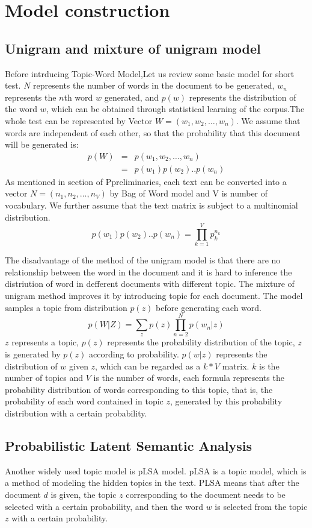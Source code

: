 \section{Model construction}\label{lca}
\subsection{Unigram and mixture of unigram model}
Before intrducing Topic-Word Model,Let us review some basic model for short test.
$N$ represents the number of words in the document to be generated, $w_n$ represents the $n$th word $w$ generated, and $p(w)$ represents the distribution of the word $w$, which can be obtained through statistical learning of the corpus.The whole test can be represented by Vector $W = (w_1,w_2,\dots,w_n)$.
We assume that words are independent of each other, so that the probability that this document will be generated is:
\begin{eqnarray*}
p(W) &=& p(w_1,w_2,\dots,w_n) \\
    &=& p(w_1)p(w_2)..p(w_n)
\end{eqnarray*}
As mentioned in section of Ppreliminaries, each text can be converted into a vector $N=(n_1,n_2,\dots,n_V)$ by Bag of Word model and V is number of vocabulary.
We further assume that the text matrix is subject to a multinomial distribution.
\[
  p(w_1)p(w_2)..p(w_n) = \prod_{k=1}^V p_k^{n_k}
\]


The disadvantage of the method of the unigram model is that there are no relationship between the word in  the document and it is hard to inference the distriution of word in defferent documents with different topic. The mixture of unigram\cite{tcf} method improves it by introducing topic for each document. The model samples a topic from distribution $p(z)$ before generating each word.
\[
  p(W|Z) = \sum_zp(z)\prod_{n=2}^{N}p(w_n|z)
\]
$z$ represents a topic, $p(z)$ represents the probability distribution of the topic, $z$ is generated by $p(z)$ according to probability. $ p(w|z)$ represents the distribution of $w$ given $z$, which can be regarded as a $k * V$ matrix.  $k$ is the number of topics and $V$ is the number of words, each formula represents the probability distribution of words corresponding to this topic, that is, the probability of each word contained in topic $z$, generated by this probability distribution with a certain probability.

\subsection{Probabilistic Latent Semantic Analysis}
Another widely used topic model is pLSA model. pLSA is a topic model, which is a method of modeling the hidden topics in the text. PLSA means that after the document $d$ is given, the topic $z$ corresponding to the document needs to be selected with a certain probability, and then the word $w$ is selected from the topic $z$ with a certain probability\cite{plsa}.

